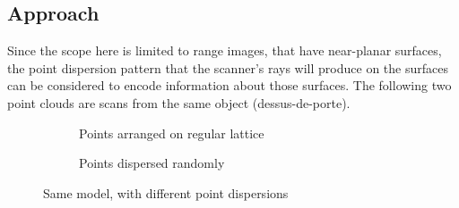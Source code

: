 \subsection{Approach}
Since the scope here is limited to range images, that have near-planar surfaces, the point dispersion pattern that the scanner's rays will produce on the surfaces can be considered to encode information about those surfaces. The following two point clouds are scans from the same object (dessus-de-porte).
\begin{figure}[H]
{
\centering
\setlength{\fboxsep}{0pt}%
\setlength{\fboxrule}{0.5pt}%
\hspace*{\fill}%
\begin{subfigure}{.48\textwidth}
	\caption{Points arranged on regular lattice}
\end{subfigure}%
\hfill%
\begin{subfigure}{.48\textwidth}
	\caption{Points dispersed randomly}
\end{subfigure}
}
\caption{Same model, with different point dispersions}
\end{figure}

